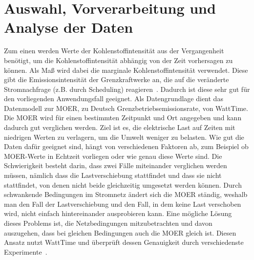 \section{Auswahl, Vorverarbeitung und Analyse der Daten}
Zum einen werden Werte der Kohlenstoffintensität aus der Vergangenheit benötigt, um die Kohlenstoffintensität abhängig von der Zeit vorhersagen zu können.
Als Maß wird dabei die marginale Kohlenstoffintensität verwendet.
Diese gibt die Emissionsintensität der Grenzkraftwerke an, die auf die veränderte Stromnachfrage (z.B. durch Scheduling) reagieren~\cite{Buchanan.2023}.
Dadurch ist diese sehr gut für den vorliegenden Anwendungsfall geeignet.
Als Datengrundlage dient das Datenmodell zur \ac{MOER}, zu Deutsch Grenzbetriebsemissionsrate, von WattTime.
Die \ac{MOER} wird für einen bestimmten Zeitpunkt und Ort angegeben und kann dadurch gut verglichen werden.
Ziel ist es, die elektrische Last auf Zeiten mit niedrigen Werten zu verlagern, um die Umwelt weniger zu belasten.
Wie gut die Daten dafür geeignet sind, hängt von verschiedenen Faktoren ab, zum Beispiel ob \ac{MOER}-Werte in Echtzeit vorliegen oder wie genau diese Werte sind.
Die Schwierigkeit besteht darin, dass zwei Fälle miteinander verglichen werden müssen, nämlich dass die Lastverschiebung stattfindet und dass sie nicht stattfindet, von denen nicht beide gleichzeitig umgesetzt werden können.
Durch schwankende Bedingungen im Stromnetz ändert sich die \ac{MOER} ständig, weshalb man den Fall der Lastverschiebung und den Fall, in dem keine Last verschoben wird, nicht einfach hintereinander ausprobieren kann.
Eine mögliche Lösung dieses Problems ist, die Netzbedingungen mitzubetrachten und davon auszugehen, dass bei gleichen Bedingungen auch die MOER gleich ist.
Diesen Ansatz nutzt WattTime und überprüft dessen Genauigkeit durch verschiedenste Experimente~\cite{WattTime.2022}.

